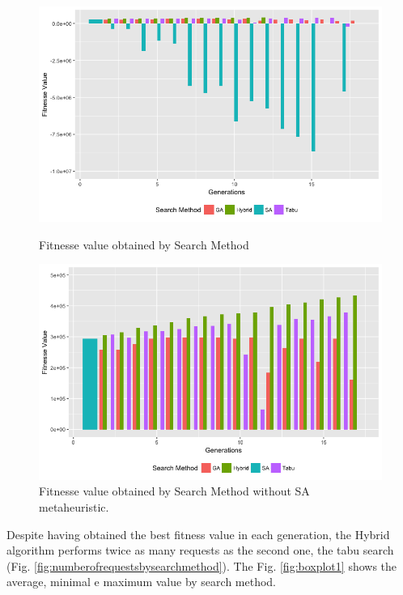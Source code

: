 \documentclass[times]{stvrauth}
\begin{document}
\begin{figure}[h]
\begin{minipage}{.5\textwidth}
\centering
\includegraphics[width=1\textwidth]{./images/experiment1-1.png}
\caption{Fitnesse value obtained by Search Method }
\label{fig:fitnessebygeneration1}
\end{minipage}
\begin{minipage}{.5\textwidth}
\centering
\includegraphics[width=1\textwidth]{./images/experiment1-2.png}
\caption{Fitnesse value obtained by Search Method without SA metaheuristic.}
\label{fig:fitnessebygeneration1-2}
\end{minipage}
\end{figure}

Despite having obtained the best fitness value in each generation, the Hybrid algorithm performs twice as many requests as the second one, the tabu search (Fig. \ref{fig:numberofrequestsbysearchmethod}). The Fig. \ref{fig:boxplot1} shows the average, minimal e maximum value by search method.
\end{document}

